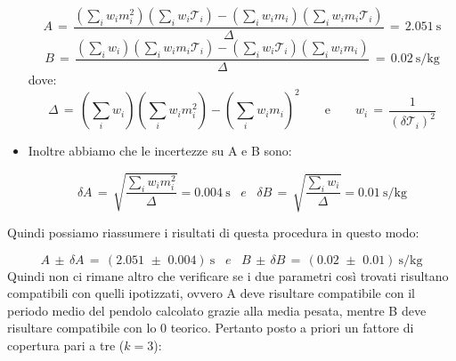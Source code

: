 \begin{itemize}
{			\begin{equation*}
				A \,=\, \frac{(\sum_i w_i m_i^2)(\sum_i w_i \mathcal{T}_i) - (\sum_i w_i m_i)(\sum_i w_i m_i \mathcal{T}_i)}{\Delta}
                \,=\, \SI{2.051}{\second}
			\end{equation*}
			\begin{equation*}
				B \,=\, \frac{(\sum_i w_i)(\sum_i w_i m_i \mathcal{T}_i) - (\sum_i w_i \mathcal{T}_i)(\sum_i w_i m_i)}{\Delta}
                \,=\, \SI{0.02}{\second\per\kilo\gram}
			\end{equation*}
			dove:
			\begin{equation*}
				\Delta \,=\, (\sum_i w_i)(\sum_i w_i m_i^2) - (\sum_i w_i m_i)^2 \qquad \text{e} \qquad
				w_i \,=\, \frac{1}{(\delta \mathcal{T}_i)^2}
			\end{equation*}}
	\item{Inoltre abbiamo che le incertezze su A e B sono:

			\begin{equation*}
				\delta A \,=\, \sqrt{\frac{\sum_i w_i m_i^2}{\Delta}} = \SI{0.004}{\second}  \,\,\,\,\, e \,\,\,\,\,
				\delta B \,=\, \sqrt{\frac{\sum_i w_i}{\Delta}} = \SI{0.01}{\second\per\kilo\gram}
			\end{equation*}}
	\end{itemize} 
	Quindi possiamo riassumere i risultati di questa procedura in questo modo:

	\begin{equation*}
		A \,\pm\, \delta A \,=\, (2.051 \,\, \pm \,\, 0.004) \: \si{\second} \,\,\,\,\, e \,\,\,\,\,
		B \,\pm\, \delta B \,=\, (0.02 \,\, \pm \,\, 0.01) \: \si{\second\per\kilo\gram}
	\end{equation*}
Quindi non ci rimane altro che verificare se i due parametri così trovati risultano compatibili con quelli ipotizzati, ovvero A deve risultare compatibile con il periodo medio del pendolo calcolato grazie alla media pesata, mentre B deve risultare compatibile con lo 0 teorico. Pertanto posto a priori un fattore di copertura pari a tre ($k = 3$):

